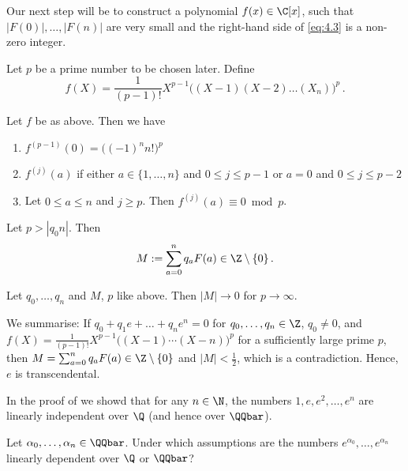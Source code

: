 Our next step will be to construct a polynomial \( f(x) \in \C[x] \), such that \( |F(0)|, \dotsc, |F(n)| \) are very small and the right-hand side of \eqref{eq:4.3} is a non-zero integer.

Let \( p \) be a prime number to be chosen later.
Define
\[ f(X) = \frac{1}{(p-1)!} X^{p-1} \big( (X-1) (X-2) \dotsc (X_n) \big)^p \,. \]

\begin{lem}
	Let \( f \) be as above.
	Then we have
	\begin{enumerate}[label=(\roman*)]
		\item \( f^{(p-1)}(0) = \big( (-1)^n n! \big)^p \)
		\item \( f^{(j)} (a) \) if either \( a \in \{1, \dotsc, n\} \) and \( 0 \leq j \leq p-1 \) or \( a=0 \) and \( 0 \leq j \leq p-2 \)
		\item Let \( 0 \leq a \leq n \) and \( j \geq p \). Then \( f^{(j)}(a) \equiv 0 \bmod p \).
	\end{enumerate}
\end{lem}

\begin{lem}
	Let \( p > |q_0 n| \).
	Then
	\[ M := \sum_{a=0}^{n} q_a F(a) \in \Z \setminus \{0\} \,. \]
\end{lem}

\begin{lem}
	Let \( q_0, \dotsc, q_n \) and \( M \), \( p \) like above.
	Then \( |M| \to 0 \) for \( p \to \infty \).
\end{lem}

We summarise: If \( q_0 + q_1e + \dots + q_ne^n = 0 \) for \( q_0, \dotsc, q_n \in \Z \), \( q_0 \neq 0 \), and \( f(X) = \frac{1}{(p-1)!} X^{p-1} \big( (X-1) \dotsm (X-n) \big)^p \) for a sufficiently large prime \( p \), then \( M = \sum_{a=0}^{n} q_a F(a) \in \Z \setminus \{0\} \) and \( |M| < \frac{1}{2} \), which is a contradiction.
Hence, \( e \) is transcendental.

\begin{rem*}
	In the proof of  we showd that for any \( n \in \N \), the numbers \( 1, e, e^2, \dotsc, e^n \) are linearly independent over \( \Q \) (and hence over \( \QQbar \)). 
\end{rem*}

\begin{frage*}
	Let \( \alpha_0, \dotsc, \alpha_n \in \QQbar \).
	Under which assumptions are the numbers \( e^{\alpha_0}, \dotsc, e^{\alpha_n} \) linearly dependent over \( \Q \) or \( \QQbar \)?
\end{frage*}

